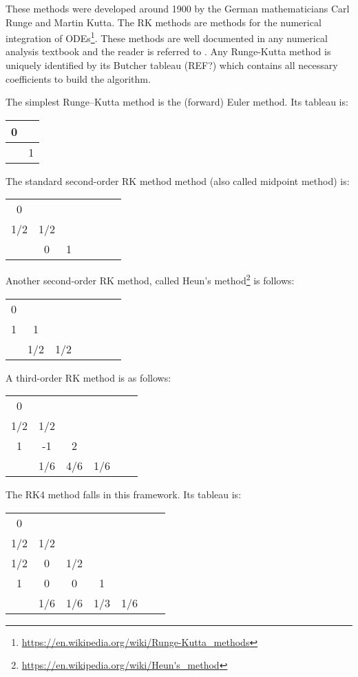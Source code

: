 These methods were developed around 1900 by the German mathematicians Carl Runge and Martin Kutta.
The RK methods are methods for the numerical integration of 
ODEs\footnote{\url{https://en.wikipedia.org/wiki/Runge-Kutta_methods}}. These methods are well 
documented in any numerical analysis textbook and the reader is referred to \cite{gery10,tack10}.
Any Runge-Kutta method is uniquely identified by its Butcher tableau (REF?) which contains 
all necessary coefficients to build the algorithm.

The simplest Runge–Kutta method is the (forward) Euler method. Its tableau is:

\begin{tabular}{c|c}
0 & \\
\hline
 & 1
\end{tabular}

 
The standard second-order RK method method (also called midpoint method) is:

\begin{tabular}{c|cccccc}
0 & \\
1/2 & 1/2 \\
\hline
 & 0 & 1 
\end{tabular}

Another second-order RK method, called Heun's 
method\footnote{\url{https://en.wikipedia.org/wiki/Heun's_method}} is follows:

\begin{tabular}{c|cccccc}
0 & \\
1 & 1 \\
\hline
 & 1/2 & 1/2 
\end{tabular}

A third-order RK method is as follows:

\begin{tabular}{c|ccccc}
0 & \\
1/2 & 1/2 \\
1 & -1 & 2 \\ 
\hline
 & 1/6 & 4/6  & 1/6
\end{tabular}


The RK4 method falls in this framework. Its tableau is:

\begin{tabular}{c|cccccc}
0 & \\
1/2 & 1/2 \\
1/2 & 0 & 1/2 \\
1 & 0 & 0 & 1 \\
\hline
 & 1/6 & 1/6 & 1/3 & 1/6 
\end{tabular}

